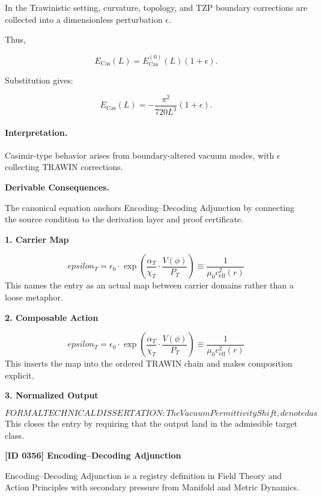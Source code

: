 In the Trawinistic setting, curvature, topology, and TZP boundary corrections are collected into a dimensionless perturbation $\epsilon$.

Thus,

\begin{equation}
E_{\mathrm{Cas}}(L)
=
E_{\mathrm{Cas}}^{(0)}(L)(1+\epsilon).
\end{equation}

Substitution gives:

\begin{equation}
\boxed{
E_{\mathrm{Cas}}(L)
=
-\frac{\pi^2}{720L^3}(1+\epsilon).
}
\end{equation}

\paragraph{Interpretation.}
Casimir-type behavior arises from boundary-altered vacuum modes, with $\epsilon$ collecting TRAWIN corrections.

\par\vspace{0.35em}
\noindent\textbf{Derivable Consequences.}\quad
\begingroup
\footnotesize
\raggedright
The canonical equation anchors Encoding--Decoding Adjunction by connecting the source condition to the derivation layer and proof certificate.
\par\endgroup

\noindent\textbf{1. Carrier Map}\par
\[
epsilon_T = \epsilon_0 \cdot \exp\left( \frac{\alpha_T}{\chi_T} \cdot \frac{V(\phi)}{P_T} \right) \equiv \frac{1}{\mu_0 c_{\text{eff}}^2(r)}
\]
\noindent This names the entry as an actual map between carrier domains rather than a loose metaphor.\par
\noindent\textbf{2. Composable Action}\par
\[
epsilon_T = \epsilon_0 \cdot \exp\left( \frac{\alpha_T}{\chi_T} \cdot \frac{V(\phi)}{P_T} \right) \equiv \frac{1}{\mu_0 c_{\text{eff}}^2(r)}
\]
\noindent This inserts the map into the ordered TRAWIN chain and makes composition explicit.\par
\noindent\textbf{3. Normalized Output}\par
\[
FORMAL TECHNICAL DISSERTATION:The Vacuum Permittivity Shift, denoted as
\]
\noindent This closes the entry by requiring that the output land in the admissible target class.\par

\clearpage
\noindent\textbf{[ID 0356] Encoding--Decoding Adjunction}\par
\vspace{0.35em}
\begingroup\small
{}
Encoding--Decoding Adjunction is a registry definition in Field Theory and Action Principles with secondary pressure from Manifold and Metric Dynamics.

